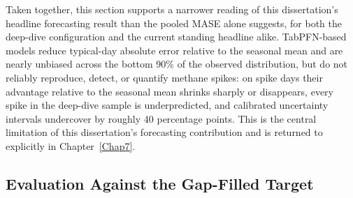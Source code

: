 Taken together, this section supports a narrower reading of this dissertation's headline forecasting
result than the pooled MASE alone suggests, for both the deep-dive configuration and the current
standing headline alike. TabPFN-based models reduce typical-day absolute error relative to the
seasonal mean and are nearly unbiased across the bottom 90\% of the observed distribution, but do not
reliably reproduce, detect, or quantify methane spikes: on spike days their advantage relative to the
seasonal mean shrinks sharply or disappears, every spike in the deep-dive sample is underpredicted,
and calibrated uncertainty intervals undercover by roughly 40 percentage points. This is the central
limitation of this dissertation's forecasting contribution and is returned to explicitly in
Chapter~\ref{Chap7}.

\FloatBarrier

\subsection{Evaluation Against the Gap-Filled Target}

\begin{table}[h]
\centering
\footnotesize
{}
\caption{The same model roster, scored against the gap-filled target instead of real observations
-- the ranking reverses, as flagged in Section 5.1.3.}
\end{table}


